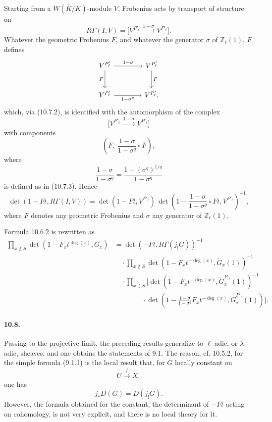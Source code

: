 \documentclass[10pt]{article}
\newcommand{\Z}{\mathbb Z}
\begin{document}
\begin{enumerate}[label=(\alph*)]
Starting from a \(W(\overline K/K)\)-module \(V\), Frobenius acts by transport of structure on
\[
R\Gamma(I,V)=
\bigl[V^{P'_\ell}\xrightarrow{\,1-\sigma\,}V^{P'_\ell}\bigr].
\]
Whatever the geometric Frobenius \(F\), and whatever the generator \(\sigma\) of \(\Z_\ell(1)\), \(F\) defines
\[
\begin{tikzcd}[column sep=4.0em,row sep=2.6em]
V^{P'_\ell}\arrow[r,"1-\sigma"]\arrow[d,"F"']&
V^{P'_\ell}\arrow[d,"F"]\\
V^{P'_\ell}\arrow[r,"1-\sigma^q"']&
V^{P'_\ell},
\end{tikzcd}
\]
which, via (10.7.2), is identified with the automorphism of the complex
\[
\bigl[V^{P'_\ell}\xrightarrow{\,1-\sigma\,}V^{P'_\ell}\bigr]
\]
with components
\[
\left(F,\ \frac{1-\sigma}{1-\sigma^q}\circ F\right),
\]
where
\[
\frac{1-\sigma}{1-\sigma^q}
=
\frac{1-(\sigma^q)^{1/q}}{1-\sigma^q}
\]
is defined as in (10.7.3). Hence
\[
\det(1-Ft,R\Gamma(I,V))
=
\det(1-Ft,V^{P'_\ell})\,
\det\!\left(1-\frac{1-\sigma}{1-\sigma^q}\circ Ft,V^{P'_\ell}\right)^{-1},
\]
where \(F\) denotes any geometric Frobenius and \(\sigma\) any generator of \(\Z_\ell(1)\).

Formula 10.6.2 is rewritten as
\[
\tag{10.7.4}
\begin{aligned}
\prod_{x\notin S}\det(1-F_xt^{\deg(x)},G_x)
&=\det(-Ft,R\Gamma(j_!G))^{-1}\\
&\quad\cdot
\prod_{x\notin S}\det(1-F_xt^{-\deg(x)},\check G_x(1))^{-1}\\
&\quad\cdot
\prod_{x\in S}\Biggl[
\det(1-F_xt^{-\deg(x)},\check G_x^{P'_\ell}(1))^{-1}\\
&\qquad\qquad\cdot
\det\!\left(1-\frac{1-\sigma}{1-\sigma^q}F_xt^{-\deg(x)},\check G_x^{P'_\ell}(1)\right)
\Biggr].
\end{aligned}
\]

\end{enumerate}

\paragraph{10.8.} Passing to the projective limit, the preceding results generalize to \(\ell\)-adic, or \(\lambda\)-adic, sheaves, and one obtains the statements of 9.1. The reason, cf. 10.5.2, for the simple formula (9.1.1) is the local result that, for \(G\) locally constant on
\[
U\xrightarrow{j}X,
\]
one has
\[
j_*D(G)=D(j_!G).
\]
However, the formula obtained for the constant, the determinant of \(-Ft\) acting on cohomology, is not very explicit, and there is no local theory for it.
\end{document}
